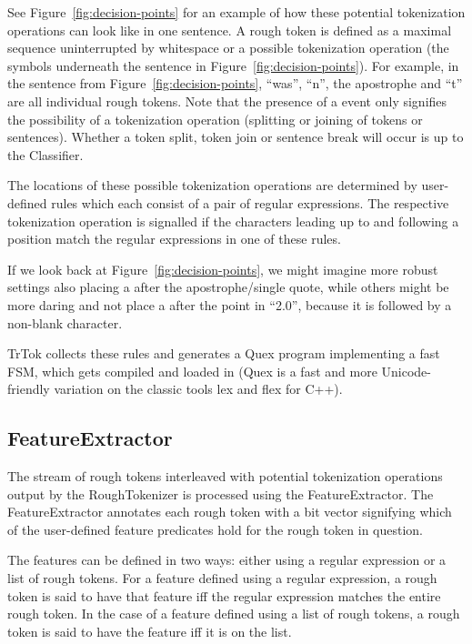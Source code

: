 See Figure~\ref{fig:decision-points} for an example of how these
potential tokenization operations can look like in one sentence. A
rough token is defined as a maximal sequence uninterrupted by
whitespace or a possible tokenization operation (the symbols
underneath the sentence in Figure~\ref{fig:decision-points}). For
example, in the sentence from Figure~\ref{fig:decision-points},
``was'', ``n'', the apostrophe and ``t'' are all individual rough
tokens. Note that the presence of a \may{} event only signifies the
possibility of a tokenization operation (splitting or joining of
tokens or sentences). Whether a token split, token join or sentence
break will occur is up to the Classifier.

The locations of these possible tokenization operations are determined
by user-defined rules which each consist of a pair of regular
expressions. The respective tokenization operation is signalled if the
characters leading up to and following a position match the regular
expressions in one of these rules.

If we look back at Figure~\ref{fig:decision-points}, we might imagine
more robust settings also placing a \maybreaksentence{} after the
apostrophe/single quote, while others might be more daring and not
place a \maybreaksentence{} after the point in ``2.0'', because it is
followed by a non-blank character.

TrTok collects these rules and generates a Quex program implementing a
fast FSM, which gets compiled and loaded in (Quex is a fast and more
Unicode-friendly variation on the classic tools lex and flex for C++).

\subsection{FeatureExtractor}

The stream of rough tokens interleaved with potential tokenization
operations output by the RoughTokenizer is processed using the
FeatureExtractor. The FeatureExtractor annotates each rough token with
a bit vector signifying which of the user-defined feature predicates
hold for the rough token in question.

The features can be defined in two ways: either using a regular
expression or a list of rough tokens. For a feature defined using a
regular expression, a rough token is said to have that feature iff the
regular expression matches the entire rough token. In the case of a
feature defined using a list of rough tokens, a rough token is said to
have the feature iff it is on the list.

